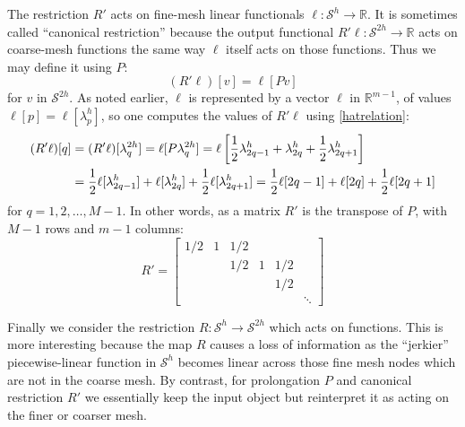 \documentclass[letterpaper,final,12pt,reqno]{amsart}
\newcommand{\RR}{\mathbb{R}}
\begin{document}
The restriction $R'$ acts on fine-mesh linear functionals $\ell:\mathcal{S}^h \to \RR$.  It is sometimes called ``canonical restriction'' \cite{GraeserKornhuber2009} because the output functional $R'\ell:\mathcal{S}^{2h}\to \RR$ acts on coarse-mesh functions the same way $\ell$ itself acts on those functions.  Thus we may define it using $P$:
\begin{equation}
  (R'\ell)[v] = \ell[Pv]  \label{rprimedefinition}
\end{equation}
for $v$ in $\mathcal{S}^{2h}$.  As noted earlier, $\ell$ is represented by a vector $\bm{\ell}$ in $\RR^{m-1}$, of values $\ell[p] = \ell[\lambda_p^h]$, so one computes the values of $R'\ell$ using \eqref{hatrelation}:
\begin{align}
  (R'\ell)[q] &= (R'\ell)[\lambda_q^{2h}] = \ell[P\lambda_q^{2h}] = \ell\left[\frac{1}{2} \lambda_{2q-1}^h + \lambda_{2q}^h + \frac{1}{2} \lambda_{2q+1}^h\right]  \label{rprimeformula} \\
      &= \frac{1}{2} \ell[\lambda_{2q-1}^h] + \ell[\lambda_{2q}^h] + \frac{1}{2} \ell[\lambda_{2q+1}^h] = \frac{1}{2} \ell[2q-1] + \ell[2q] + \frac{1}{2} \ell[2q+1]  \notag
\end{align}
for $q=1,2,\dots,M-1$.  In other words, as a matrix $R'$ is the transpose of $P$, with $M-1$ rows and $m-1$ columns:
\begin{equation}
R' = \begin{bmatrix}
1/2 & 1 & 1/2 &   &     & \\
    &   & 1/2 & 1 & 1/2 & \\
    &   &     &   & 1/2 & \\
    &   &     &   &     & \ddots
\end{bmatrix} \label{rprimematrix}
\end{equation}

Finally we consider the restriction $R:\mathcal{S}^h\to\mathcal{S}^{2h}$ which acts on functions.  This is more interesting because the map $R$ causes a loss of information as the ``jerkier'' piecewise-linear function in $\mathcal{S}^h$ becomes linear across those fine mesh nodes which are not in the coarse mesh.  By contrast, for prolongation $P$ and canonical restriction $R'$ we essentially keep the input object but reinterpret it as acting on the finer or coarser mesh.

\newcommand{\Rpr}{R_{\text{pr}}}
\newcommand{\Rin}{R_{\text{in}}}
\newcommand{\Rfw}{R_{\text{fw}}}
\end{document}
